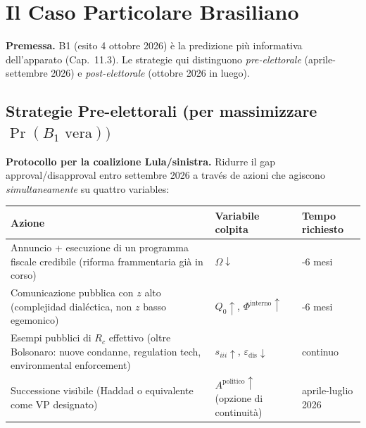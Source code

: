 \section{Il Caso Particolare
Brasiliano}\label{il-caso-particolare-brasileño}

\Hypoth{} \textbf{Premessa.} B1 (esito 4 ottobre 2026) è la predizione
più informativa dell'apparato (Cap.~11.3). Le strategie qui distinguono
\emph{pre-elettorale} (aprile-settembre 2026) e \emph{post-elettorale}
(ottobre 2026 in luego).

\subsection{\texorpdfstring{Strategie Pre-elettorali (per massimizzare
\(\Pr(B_1 \text{ vera}))\)}{Strategie Pre-elettorali (per massimizzare \textbackslash Pr(B\_1 \textbackslash text\{ vera\}))}}\label{strategie-pre-elettorali-per-massimizzare-prb_1-text-vera}

\Hypoth{} \textbf{Protocollo per la coalizione Lula/sinistra.} Ridurre
il gap approval/disapproval entro settembre 2026 a través de azioni che
agiscono \emph{simultaneamente} su quattro variables:

{\def\LTcaptype{none} %
{\small\begin{longtable}[]{@{}
  >{\raggedright\arraybackslash}p{}
  >{\raggedright\arraybackslash}p{}
  >{\raggedright\arraybackslash}p{}@{}}
\toprule\noalign{}
\begin{minipage}[b]{\linewidth}\raggedright
Azione
\end{minipage} & \begin{minipage}[b]{\linewidth}\raggedright
Variabile colpita
\end{minipage} & \begin{minipage}[b]{\linewidth}\raggedright
Tempo richiesto
\end{minipage} \\
\midrule\noalign{}
\endhead
\bottomrule\noalign{}
\endlastfoot
Annuncio + esecuzione di un programma fiscale credibile (riforma
frammentaria già in corso) & \(\Omega \downarrow\) & 4-6 mesi \\
Comunicazione pubblica con \(z\) alto (complejidad dialéctica, non \(z\)
basso egemonico) & \(Q_0 \uparrow\), \(\Phi^{\text{interno}} \uparrow\)
& 3-6 mesi \\
Esempi pubblici di \(R_c\) effettivo (oltre Bolsonaro: nuove condanne,
regulation tech, environmental enforcement) & \(s_{iii} \uparrow\),
\(\varepsilon_{\text{dis}} \downarrow\) & continuo \\
Successione visibile (Haddad o equivalente come VP designato) &
\(A^{\text{politico}} \uparrow\) (opzione di continuità) & aprile-luglio
2026 \\
\end{longtable}}
}

